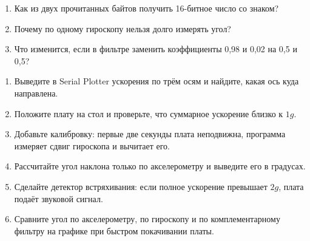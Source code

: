 \begin{selfcheck}
\begin{enumerate}
  \item Как из двух прочитанных байтов получить 16-битное число со знаком?
  \item Почему по одному гироскопу нельзя долго измерять угол?
  \item Что изменится, если в фильтре заменить коэффициенты 0,98 и 0,02 на 0,5 и 0,5?
\end{enumerate}
\end{selfcheck}

\begin{tasks}
\begin{enumerate}
\item {} Выведите в Serial Plotter ускорения по трём осям и найдите, какая ось куда направлена.
\item {} Положите плату на стол и проверьте, что суммарное ускорение близко к $1g$.
\item {} Добавьте калибровку: первые две секунды плата неподвижна, программа измеряет сдвиг гироскопа и вычитает его.
\item {} Рассчитайте угол наклона только по акселерометру и выведите его в градусах.
\item {} Сделайте детектор встряхивания: если полное ускорение превышает $2g$, плата подаёт звуковой сигнал.
\item {} Сравните угол по акселерометру, по гироскопу и по комплементарному фильтру на графике при быстром покачивании платы.
\end{enumerate}
\end{tasks}
